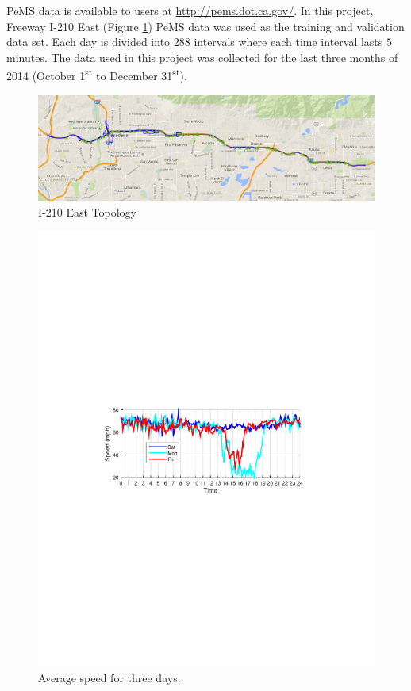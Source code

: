 \documentclass[twocolumn,10pt]{asme2e}
\begin{document}
PeMS data is available to users at \url{http://pems.dot.ca.gov/}. In this project, Freeway I-210 East (Figure \ref{fig:210}) PeMS data was used as the training and validation data set. Each day is divided into 288 intervals where each time interval lasts $5$ minutes. The data used in this project was collected for the last three months of 2014 (October 1\textsuperscript{st} to December 31\textsuperscript{st}).
\begin{figure}[h]
    \centering
    \includegraphics[width=1\linewidth]{210.png}
    \caption{I-210 East Topology}
    \label{fig:210}
\end{figure} 

\begin{figure}[h]
	\centering
	\includegraphics[width=0.7\linewidth]{./Figures/spd1}
	\caption{Average speed for three days.}
	\label{fig:spd1}
\end{figure} 
\end{document}
